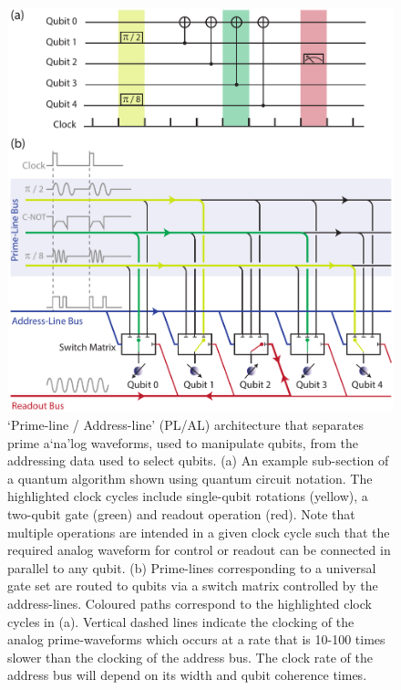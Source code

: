 \begin{figure}
\centering
\includegraphics[width=0.8\linewidth]{Fig0_arch}
\caption[Proposed Prime-line/Address-line architecture]{\label{fig:PLAL}`Prime-line / Address-line' (PL/AL) architecture that separates prime a`na'log waveforms, used to manipulate qubits, from the addressing data used to select qubits. (a) An example sub-section of a quantum algorithm shown using quantum circuit notation. The highlighted clock cycles include single-qubit rotations (yellow), a two-qubit gate (green) and readout operation (red). Note that multiple operations are intended in a given clock cycle such that the required analog waveform for control or readout can be connected in parallel to any qubit. (b) Prime-lines corresponding to a universal gate set are routed to qubits via a switch matrix controlled by the address-lines. Coloured paths correspond to the highlighted clock cycles in (a). Vertical dashed lines indicate the clocking of the analog prime-waveforms which occurs at a rate that is 10-100 times slower than the clocking of the address bus. The clock rate of the address bus will depend on its width and qubit coherence times.}
\end{figure}

